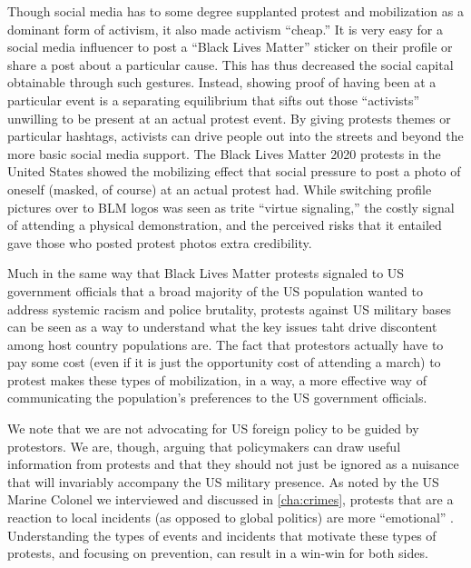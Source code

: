 Though social media has to some degree supplanted protest and mobilization as a dominant form of activism, it also made activism ``cheap.'' It is very easy for a social media influencer to post a ``Black Lives Matter'' sticker on their profile or share a post about a particular cause. This has thus decreased the social capital obtainable through such gestures. Instead, showing proof of having been at a particular event is a separating equilibrium that sifts out those ``activists'' unwilling to be present at an actual protest event. By giving protests themes or particular hashtags, activists can drive people out into the streets and beyond the more basic social media support. The Black Lives Matter 2020 protests in the United States showed the mobilizing effect that social pressure to post a photo of oneself (masked, of course) at an actual protest had. While switching profile pictures over to BLM logos was seen as trite ``virtue signaling,'' the costly signal of attending a physical demonstration, and the perceived risks that it entailed gave those who posted protest photos extra credibility.

Much in the same way that Black Lives Matter protests signaled to US government officials that a broad majority of the US population wanted to address systemic racism and police brutality, protests against US military bases can be seen as a way to understand what the key issues taht drive discontent among host country populations are. The fact that protestors actually have to pay some cost (even if it is just the opportunity cost of attending a march) to protest makes these types of mobilization, in a way, a more effective way of communicating the population's preferences to the US government officials.

We note that we are not advocating for US foreign policy to be guided by protestors. We are, though, arguing that policymakers can draw useful information from protests and that they should not just be ignored as a nuisance that will invariably accompany the US military presence. As noted by the US Marine Colonel we interviewed and discussed in \ref{cha:crimes}, protests that are a reaction to local incidents (as opposed to global politics) are more ``emotional'' \cite{marinecolonel20211011}. Understanding the types of events and incidents that motivate these types of protests, and focusing on prevention, can result in a win-win for both sides.  

